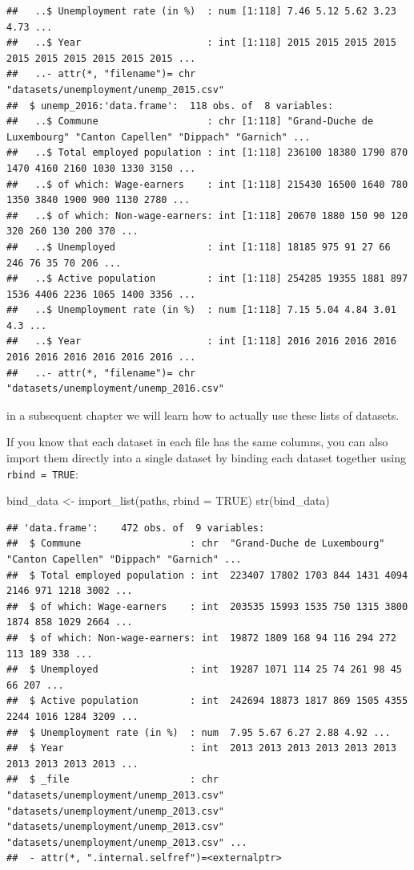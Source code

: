 \documentclass[
]{article}
\newenvironment{Shaded}{\begin{snugshade}}{\end{snugshade}}
\newcommand{\AttributeTok}[1]{\textcolor[rgb]{0.77,0.63,0.00}{#1}}
\newcommand{\ConstantTok}[1]{\textcolor[rgb]{0.00,0.00,0.00}{#1}}
\newcommand{\FunctionTok}[1]{\textcolor[rgb]{0.00,0.00,0.00}{#1}}
\newcommand{\NormalTok}[1]{#1}
\newcommand{\OtherTok}[1]{\textcolor[rgb]{0.56,0.35,0.01}{#1}}
\begin{document}
\begin{verbatim}
##   ..$ Unemployment rate (in %)  : num [1:118] 7.46 5.12 5.62 3.23 4.73 ...
##   ..$ Year                      : int [1:118] 2015 2015 2015 2015 2015 2015 2015 2015 2015 2015 ...
##   ..- attr(*, "filename")= chr "datasets/unemployment/unemp_2015.csv"
##  $ unemp_2016:'data.frame':  118 obs. of  8 variables:
##   ..$ Commune                   : chr [1:118] "Grand-Duche de Luxembourg" "Canton Capellen" "Dippach" "Garnich" ...
##   ..$ Total employed population : int [1:118] 236100 18380 1790 870 1470 4160 2160 1030 1330 3150 ...
##   ..$ of which: Wage-earners    : int [1:118] 215430 16500 1640 780 1350 3840 1900 900 1130 2780 ...
##   ..$ of which: Non-wage-earners: int [1:118] 20670 1880 150 90 120 320 260 130 200 370 ...
##   ..$ Unemployed                : int [1:118] 18185 975 91 27 66 246 76 35 70 206 ...
##   ..$ Active population         : int [1:118] 254285 19355 1881 897 1536 4406 2236 1065 1400 3356 ...
##   ..$ Unemployment rate (in %)  : num [1:118] 7.15 5.04 4.84 3.01 4.3 ...
##   ..$ Year                      : int [1:118] 2016 2016 2016 2016 2016 2016 2016 2016 2016 2016 ...
##   ..- attr(*, "filename")= chr "datasets/unemployment/unemp_2016.csv"
\end{verbatim}

in a subsequent chapter we will learn how to actually use these lists of datasets.

If you know that each dataset in each file has the same columns, you can also import them directly
into a single dataset by binding each dataset together using \texttt{rbind\ =\ TRUE}:

\begin{Shaded}
\begin{Highlighting}[]
\NormalTok{bind\_data }\OtherTok{\textless{}{-}} \FunctionTok{import\_list}\NormalTok{(paths, }\AttributeTok{rbind =} \ConstantTok{TRUE}\NormalTok{)}
\FunctionTok{str}\NormalTok{(bind\_data)}
\end{Highlighting}
\end{Shaded}

\begin{verbatim}
## 'data.frame':    472 obs. of  9 variables:
##  $ Commune                   : chr  "Grand-Duche de Luxembourg" "Canton Capellen" "Dippach" "Garnich" ...
##  $ Total employed population : int  223407 17802 1703 844 1431 4094 2146 971 1218 3002 ...
##  $ of which: Wage-earners    : int  203535 15993 1535 750 1315 3800 1874 858 1029 2664 ...
##  $ of which: Non-wage-earners: int  19872 1809 168 94 116 294 272 113 189 338 ...
##  $ Unemployed                : int  19287 1071 114 25 74 261 98 45 66 207 ...
##  $ Active population         : int  242694 18873 1817 869 1505 4355 2244 1016 1284 3209 ...
##  $ Unemployment rate (in %)  : num  7.95 5.67 6.27 2.88 4.92 ...
##  $ Year                      : int  2013 2013 2013 2013 2013 2013 2013 2013 2013 2013 ...
##  $ _file                     : chr  "datasets/unemployment/unemp_2013.csv" "datasets/unemployment/unemp_2013.csv" "datasets/unemployment/unemp_2013.csv" "datasets/unemployment/unemp_2013.csv" ...
##  - attr(*, ".internal.selfref")=<externalptr>
\end{verbatim}
\end{document}
